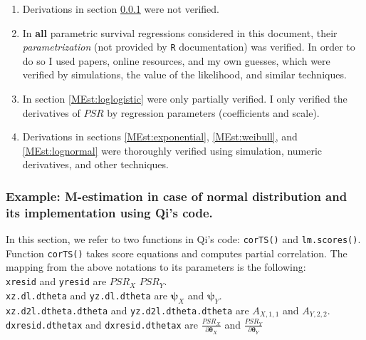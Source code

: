 \documentclass[]{article}
\begin{document}
\begin{enumerate}[1)]
\item Derivations in section \ref{norm:QiCode} were not verified.

\item In \textbf{all} parametric survival regressions considered in this document, their \emph{parametrization} (not provided by \texttt{R} documentation) was verified. In order to do so I used papers, online resources, and my own guesses, which were verified by simulations, the value of the likelihood, and similar techniques.

\item In section \ref{MEst:loglogistic} were only partially verified. I only verified the derivatives of $PSR$ by regression parameters (coefficients and scale).

\item Derivations in sections \ref{MEst:exponential}, \ref{MEst:weibull}, and \ref{MEst:lognormal}  were thoroughly verified using simulation, numeric derivatives, and other techniques.
\end{enumerate}

\subsubsection{Example: M-estimation in case of normal distribution and its implementation using Qi's code.}
\label{norm:QiCode}

In this section, we refer to two functions in Qi's code: \texttt{corTS()} and \texttt{lm.scores()}. Function  \texttt{corTS()} takes score equations and computes partial correlation. The mapping from the above notations to its parameters is the following:\\
\texttt{xresid} and \texttt{yresid} are $PSR_X$ $PSR_Y$.\\
\texttt{xz.dl.dtheta} and \texttt{yz.dl.dtheta} are $\pmb{\psi}_{X}$ and $\pmb{\psi}_{Y}$.\\
\texttt{xz.d2l.dtheta.dtheta} and \texttt{yz.d2l.dtheta.dtheta} are $A_{X,1,1}$ and $A_{Y,2,2}$.\\
\texttt{dxresid.dthetax} and \texttt{dxresid.dthetax} are $\frac{PSR_X}{\partial \pmb{\theta}_X}$ and $\frac{PSR_Y}{\partial \pmb{\theta}_Y}$\\
\end{document}
